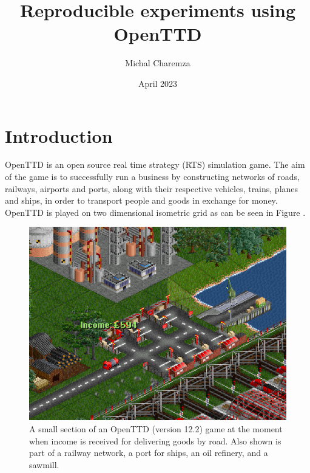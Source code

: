 \documentclass[twocolumn]{article}
\title{Reproducible experiments using OpenTTD}
\author{Michal Charemza}
\date{April 2023}
\begin{document}

\section{Introduction}

OpenTTD \cite{openttd} is an open source real time strategy (RTS) simulation game. The aim of the game is to successfully run a business by constructing networks of roads, railways, airports and ports, along with their respective vehicles, trains, planes and ships, in order to transport people and goods in exchange for money. OpenTTD is played on two dimensional isometric grid as can be seen in Figure \label{fig:openttd}.

\begin{figure}[h]
\centering
\includegraphics[width=\columnwidth]{assets/openttd-screenshot.png}
\caption{A small section of an OpenTTD (version 12.2) game at the moment when income is received for delivering goods by road. Also shown is part of a railway network, a port for ships, an oil refinery, and a sawmill.}
\label{fig:openttd}
\end{figure}
\end{document}
